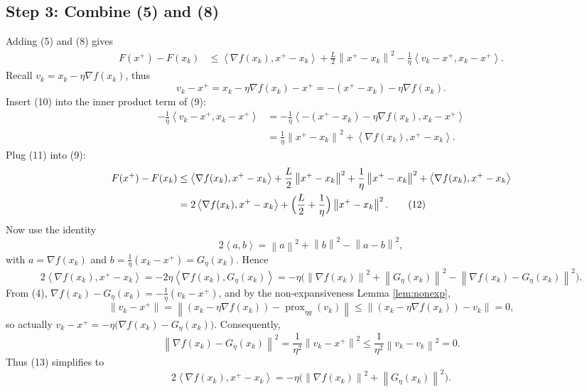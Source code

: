 \documentclass{article}
\newcommand{\prox}{\operatorname{prox}}
\newcommand{\grad}{\nabla}
\newcommand{\norm}[1]{\left\lVert #1\right\rVert}
\newcommand{\inner}[2]{\left\langle #1,#2\right\rangle}
\begin{document}
\subsection*{Step 3: Combine (5) and (8)}
Adding (5) and (8) gives
\begin{align}
F(x^{+})-F(x_{k})
&\le \inner{\grad f(x_{k})}{x^{+}-x_{k}}+\frac{L}{2}\norm{x^{+}-x_{k}}^{2}
      -\frac{1}{\eta}\inner{v_{k}-x^{+}}{x_{k}-x^{+}}.
\tag{9}
\end{align}
Recall $v_{k}=x_{k}-\eta\grad f(x_{k})$, thus
\[
v_{k}-x^{+}=x_{k}-\eta\grad f(x_{k})-x^{+}=-(x^{+}-x_{k})-\eta\grad f(x_{k}).
\tag{10}
\]
Insert (10) into the inner product term of (9):
\begin{align}
-\frac{1}{\eta}\inner{v_{k}-x^{+}}{x_{k}-x^{+}}
&=-\frac{1}{\eta}\inner{-(x^{+}-x_{k})-\eta\grad f(x_{k})}{x_{k}-x^{+}} \nonumber\\
&=\frac{1}{\eta}\norm{x^{+}-x_{k}}^{2}+\inner{\grad f(x_{k})}{x^{+}-x_{k}}.
\tag{11}
\end{align}
Plug (11) into (9):
\begin{align}
F(x^{+})-F(x_{k})
&\le \inner{\grad f(x_{k})}{x^{+}-x_{k}}+\frac{L}{2}\norm{x^{+}-x_{k}}^{2}
   +\frac{1}{\eta}\norm{x^{+}-x_{k}}^{2}+\inner{\grad f(x_{k})}{x^{+}-x_{k}} \nonumber\\
&=2\inner{\grad f(x_{k})}{x^{+}-x_{k}}+\Bigl(\frac{L}{2}+\frac{1}{\eta}\Bigr)\norm{x^{+}-x_{k}}^{2}.
\tag{12}
\end{align}
Now use the identity
\[
2\inner{a}{b}= \norm{a}^{2}+\norm{b}^{2}-\norm{a-b}^{2},
\]
with $a=\grad f(x_{k})$ and $b=\frac{1}{\eta}(x_{k}-x^{+})=G_{\eta}(x_{k})$. Hence
\[
2\inner{\grad f(x_{k})}{x^{+}-x_{k}}
= -2\eta\inner{\grad f(x_{k})}{G_{\eta}(x_{k})}
= -\eta\bigl(\norm{\grad f(x_{k})}^{2}+\norm{G_{\eta}(x_{k})}^{2}
          -\norm{\grad f(x_{k})-\!G_{\eta}(x_{k})}^{2}\bigr).
\tag{13}
\]
From (4), $\grad f(x_{k})-G_{\eta}(x_{k}) = -\frac{1}{\eta}(v_{k}-x^{+})$, and by the non‑expansiveness Lemma \ref{lem:nonexp},
\[
\norm{v_{k}-x^{+}} = \norm{(x_{k}-\eta\grad f(x_{k}))- \prox_{\eta g}(v_{k})}
   \le \norm{(x_{k}-\eta\grad f(x_{k}))-v_{k}} = 0,
\]
so actually $v_{k}-x^{+}= -\eta\bigl(\grad f(x_{k})-G_{\eta}(x_{k})\bigr)$. Consequently,
\[
\norm{\grad f(x_{k})-\!G_{\eta}(x_{k})}^{2}= \frac{1}{\eta^{2}}\norm{v_{k}-x^{+}}^{2}
\le \frac{1}{\eta^{2}}\norm{v_{k}-v_{k}}^{2}=0.
\tag{14}
\]
Thus (13) simplifies to
\[
2\inner{\grad f(x_{k})}{x^{+}-x_{k}} = -\eta\bigl(\norm{\grad f(x_{k})}^{2}+\norm{G_{\eta}(x_{k})}^{2}\bigr).
\tag{15}
\]
\end{document}
